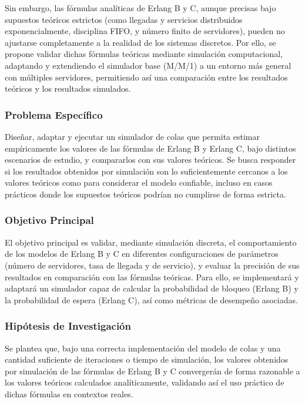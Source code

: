 \documentclass{article}
\begin{document}
Sin embargo, las fórmulas analíticas de Erlang B y C, aunque precisas bajo supuestos teóricos estrictos (como llegadas y servicios distribuidos exponencialmente, disciplina FIFO, y número finito de servidores), pueden no ajustarse completamente a la realidad de los sistemas discretos. Por ello, se propone validar dichas fórmulas teóricas mediante simulación computacional, adaptando y extendiendo el simulador base (M/M/1) a un entorno más general con múltiples servidores, permitiendo así una comparación entre los resultados teóricos y los resultados simulados.

\subsubsection{Problema Específico}

Diseñar, adaptar y ejecutar un simulador de colas que permita estimar empíricamente los valores de las fórmulas de Erlang B y Erlang C, bajo distintos escenarios de estudio, y compararlos con sus valores teóricos. Se busca responder si los resultados obtenidos por simulación son lo suficientemente cercanos a los valores teóricos como para considerar el modelo confiable, incluso en casos prácticos donde los supuestos teóricos podrían no cumplirse de forma estricta.

\subsubsection{Objetivo Principal}

El objetivo principal es validar, mediante simulación discreta, el comportamiento de los modelos de Erlang B y C en diferentes configuraciones de parámetros (número de servidores, tasa de llegada y de servicio), y evaluar la precisión de sus resultados en comparación con las fórmulas teóricas. Para ello, se implementará y adaptará un simulador capaz de calcular la probabilidad de bloqueo (Erlang B) y la probabilidad de espera (Erlang C), así como métricas de desempeño asociadas.

\subsubsection{Hipótesis de Investigación}

Se plantea que, bajo una correcta implementación del modelo de colas y una cantidad suficiente de iteraciones o tiempo de simulación, los valores obtenidos por simulación de las fórmulas de Erlang B y C convergerán de forma razonable a los valores teóricos calculados analíticamente, validando así el uso práctico de dichas fórmulas en contextos reales.
\end{document}

